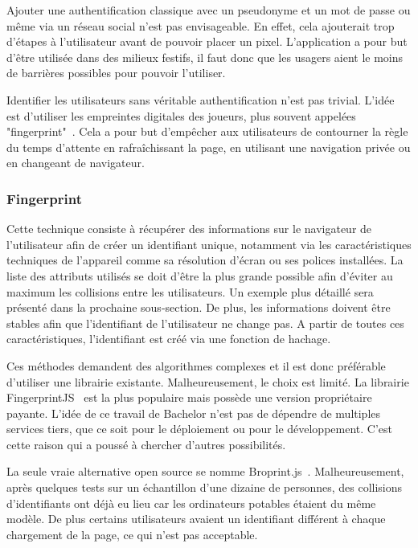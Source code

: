 Ajouter une authentification classique avec un pseudonyme et un mot de passe ou même via un réseau social n'est pas envisageable. En effet, cela ajouterait trop d'étapes à l'utilisateur avant de pouvoir placer un pixel. L'application a pour but d'être utilisée dans des milieux festifs, il faut donc que les usagers aient le moins de barrières possibles pour pouvoir l'utiliser.

Identifier les utilisateurs sans véritable authentification n'est pas trivial. L'idée est d'utiliser les empreintes digitales des joueurs, plus souvent appelées "fingerprint"~\cite{devicefingerprint}. Cela a pour but d'empêcher aux utilisateurs de contourner la règle du temps d'attente en rafraîchissant la page, en utilisant une navigation privée ou en changeant de navigateur.

\subsubsection{Fingerprint}

Cette technique consiste à récupérer des informations sur le navigateur de l'utilisateur afin de créer un identifiant unique, notamment via les caractéristiques techniques de l'appareil comme sa résolution d'écran ou ses polices installées. La liste des attributs utilisés se doit d'être la plus grande possible afin d'éviter au maximum les collisions entre les utilisateurs. Un exemple plus détaillé sera présenté dans la prochaine sous-section. De plus, les informations doivent être stables afin que l'identifiant de l'utilisateur ne change pas. A partir de toutes ces caractéristiques, l'identifiant est créé via une fonction de hachage.

Ces méthodes demandent des algorithmes complexes et il est donc préférable d'utiliser une librairie existante. Malheureusement, le choix est limité. La librairie FingerprintJS~\cite{fingerprintjs} est la plus populaire mais possède une version propriétaire payante. L'idée de ce travail de Bachelor n'est pas de dépendre de multiples services tiers, que ce soit pour le déploiement ou pour le développement. C'est cette raison qui a poussé à chercher d'autres possibilités.

La seule vraie alternative open source se nomme Broprint.js~\cite{broprintjs}. Malheureusement, après quelques tests sur un échantillon d'une dizaine de personnes, des collisions d'identifiants ont déjà eu lieu car les ordinateurs potables étaient du même modèle. De plus certains utilisateurs avaient un identifiant différent à chaque chargement de la page, ce qui n'est pas acceptable.

